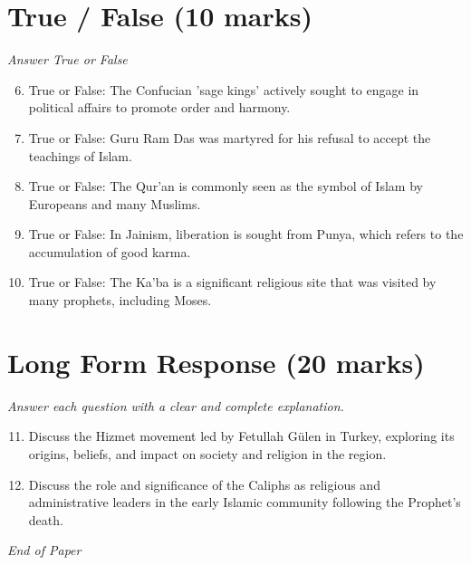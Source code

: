 \documentclass[12pt]{article}
\begin{document}
\section*{True / False (10 marks)}
\textit{Answer True or False}
\begin{enumerate}[label=\arabic*.]
\setcounter{enumi}{5}
\item True or False: The Confucian 'sage kings' actively sought to engage in political affairs to promote order and harmony.
\item True or False: Guru Ram Das was martyred for his refusal to accept the teachings of Islam.
\item True or False: The Qur'an is commonly seen as the symbol of Islam by Europeans and many Muslims.
\item True or False: In Jainism, liberation is sought from Punya, which refers to the accumulation of good karma.
\item True or False: The Ka'ba is a significant religious site that was visited by many prophets, including Moses.
\end{enumerate}

\section*{Long Form Response (20 marks)}
\textit{Answer each question with a clear and complete explanation.}
\begin{enumerate}[label=\arabic*.]
\setcounter{enumi}{10}
\item Discuss the Hizmet movement led by Fetullah Gülen in Turkey, exploring its origins, beliefs, and impact on society and religion in the region.
\item Discuss the role and significance of the Caliphs as religious and administrative leaders in the early Islamic community following the Prophet's death.
\end{enumerate}

\vfill
\noindent\textit{End of Paper}
\end{document}
